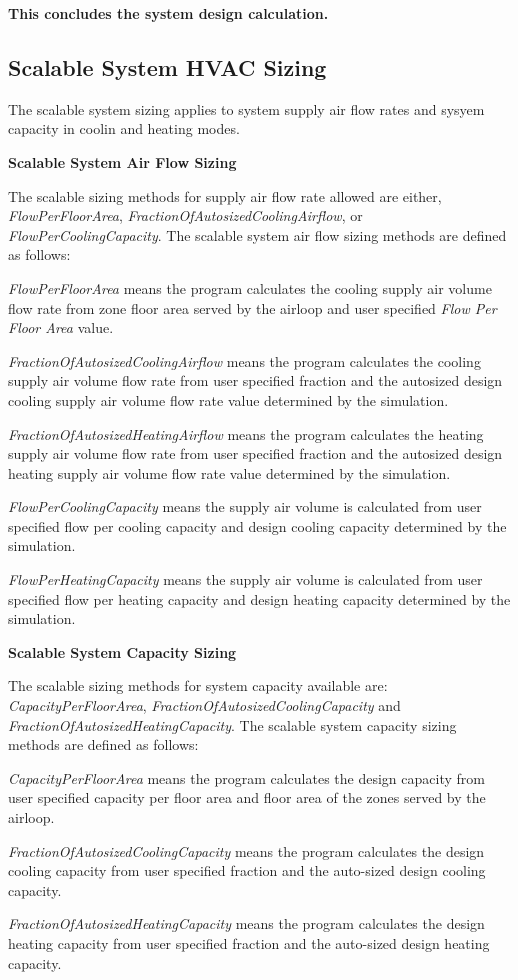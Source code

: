 \textbf{This concludes the system design calculation.}

\subsection{Scalable System HVAC Sizing}\label{scalable-system-HVAC-sizing}

The scalable system sizing applies to system supply air flow rates and sysyem capacity in coolin and heating modes.

\textbf{Scalable System Air Flow Sizing}

The scalable sizing methods for supply air flow rate allowed are either, \emph{FlowPerFloorArea}, \emph{FractionOfAutosizedCoolingAirflow}, or \emph{FlowPerCoolingCapacity}. The scalable system air flow sizing methods are defined as follows:

\emph{FlowPerFloorArea} means the program calculates the cooling supply air volume flow rate from zone floor area served by the airloop and user specified \emph{Flow Per Floor Area} value.

\emph{FractionOfAutosizedCoolingAirflow} means the program calculates the cooling supply air volume flow rate from user specified fraction and the autosized design cooling supply air volume flow rate value determined by the simulation.

\emph{FractionOfAutosizedHeatingAirflow} means the program calculates the heating supply air volume flow rate from user specified fraction and the autosized design heating supply air volume flow rate value determined by the simulation.

\emph{FlowPerCoolingCapacity} means the supply air volume is calculated from user specified flow per cooling capacity and design cooling capacity determined by the simulation.

\emph{FlowPerHeatingCapacity} means the supply air volume is calculated from user specified flow per heating capacity and design heating capacity determined by the simulation.

\textbf{Scalable System Capacity Sizing}

The scalable sizing methods for system capacity available are: \emph{CapacityPerFloorArea}, \emph{FractionOfAutosizedCoolingCapacity} and \emph{FractionOfAutosizedHeatingCapacity}. The scalable system capacity sizing methods are defined as follows:

\emph{CapacityPerFloorArea} means the program calculates the design capacity from user specified capacity per floor area and floor area of the zones served by the airloop.

\emph{FractionOfAutosizedCoolingCapacity} means the program calculates the design cooling capacity from user specified fraction and the auto-sized design cooling capacity.

\emph{FractionOfAutosizedHeatingCapacity} means the program calculates the design heating capacity from user specified fraction and the auto-sized design heating capacity.
